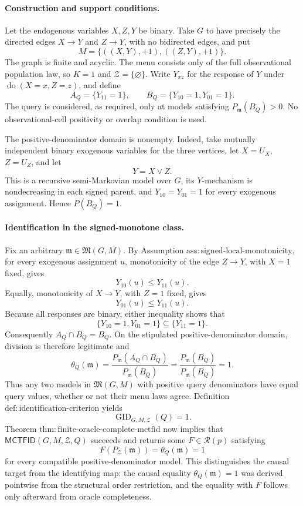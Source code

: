 \paragraph{Construction and support conditions.}
Let the endogenous variables \(X,Z,Y\) be binary.  Take \(G\) to have precisely the directed edges \(X\to Y\) and \(Z\to Y\), with no bidirected edges, and put
\[
 M=\{((X,Y),+1),((Z,Y),+1)\}.
\]
The graph is finite and acyclic.  The menu consists only of the full observational population law, so \(K=1\) and \(\mathcal Z=\{\varnothing\}\).  Write \(Y_{xz}\) for the response of \(Y\) under \(\operatorname{do}(X=x,Z=z)\), and define
\[
 A_Q=\{Y_{11}=1\},
 \qquad
 B_Q=\{Y_{10}=1,Y_{01}=1\}.
\]
The query is considered, as required, only at models satisfying \(P_{\mathfrak m}(B_Q)>0\).  No observational-cell positivity or overlap condition is used.

The positive-denominator domain is nonempty.  Indeed, take mutually independent binary exogenous variables for the three vertices, let \(X=U_X\), \(Z=U_Z\), and let
\[
 Y=X\lor Z.
\]
This is a recursive semi-Markovian model over \(G\), its \(Y\)-mechanism is nondecreasing in each signed parent, and \(Y_{10}=Y_{01}=1\) for every exogenous assignment.  Hence \(P(B_Q)=1\).

\paragraph{Identification in the signed-monotone class.}
Fix an arbitrary \(\mathfrak m\in\mathfrak M(G,M)\).  By Assumption \(\mathrm{ass:signed\text{-}local\text{-}monotonicity}\), for every exogenous assignment \(u\), monotonicity of the edge \(Z\to Y\), with \(X=1\) fixed, gives
\[
 Y_{10}(u)\le Y_{11}(u).
\]
Equally, monotonicity of \(X\to Y\), with \(Z=1\) fixed, gives
\[
 Y_{01}(u)\le Y_{11}(u).
\]
Because all responses are binary, either inequality shows that
\[
 \{Y_{10}=1,Y_{01}=1\}\subseteq\{Y_{11}=1\}.
\]
Consequently \(A_Q\cap B_Q=B_Q\).  On the stipulated positive-denominator domain, division is therefore legitimate and
\[
 \theta_Q(\mathfrak m)
 =\frac{P_{\mathfrak m}(A_Q\cap B_Q)}{P_{\mathfrak m}(B_Q)}
 =\frac{P_{\mathfrak m}(B_Q)}{P_{\mathfrak m}(B_Q)}
 =1.
\]
Thus any two models in \(\mathfrak M(G,M)\) with positive query denominators have equal query values, whether or not their menu laws agree.  Definition \(\mathrm{def:identification\text{-}criterion}\) yields
\[
 \operatorname{GID}_{G,M,\mathcal Z}(Q)=1.
\]
Theorem \(\mathrm{thm:finite\text{-}oracle\text{-}complete\text{-}mctfid}\) now implies that \(\mathsf{MCTFID}(G,M,\mathcal Z,Q)\) succeeds and returns some \(F\in\mathcal R(p)\) satisfying
\[
 F(P_{\mathcal Z}(\mathfrak m))=\theta_Q(\mathfrak m)=1
\]
for every compatible positive-denominator model.  This distinguishes the causal target from the identifying map: the causal equality \(\theta_Q(\mathfrak m)=1\) was derived pointwise from the structural order restriction, and the equality with \(F\) follows only afterward from oracle completeness.

